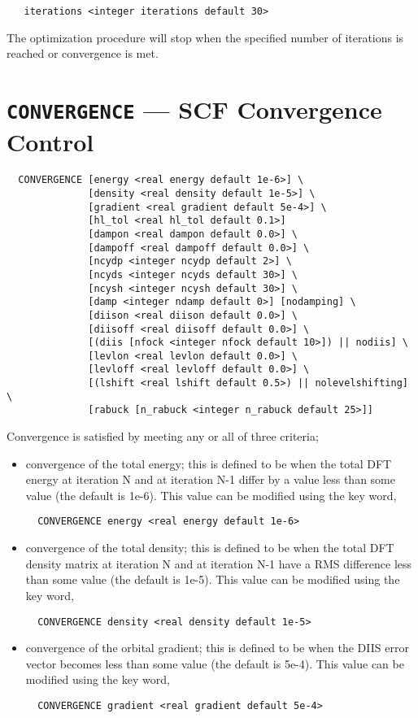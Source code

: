 \begin{verbatim}
   iterations <integer iterations default 30>
\end{verbatim}

The optimization procedure will stop when the specified number of
iterations is reached or convergence is met.

\section{{\tt CONVERGENCE} --- SCF Convergence Control}
\label{sec:dftconv}

\begin{verbatim}
  CONVERGENCE [energy <real energy default 1e-6>] \
              [density <real density default 1e-5>] \
              [gradient <real gradient default 5e-4>] \
              [hl_tol <real hl_tol default 0.1>]
              [dampon <real dampon default 0.0>] \
              [dampoff <real dampoff default 0.0>] \
              [ncydp <integer ncydp default 2>] \
              [ncyds <integer ncyds default 30>] \
              [ncysh <integer ncysh default 30>] \
              [damp <integer ndamp default 0>] [nodamping] \
              [diison <real diison default 0.0>] \
              [diisoff <real diisoff default 0.0>] \
              [(diis [nfock <integer nfock default 10>]) || nodiis] \
              [levlon <real levlon default 0.0>] \
              [levloff <real levloff default 0.0>] \
              [(lshift <real lshift default 0.5>) || nolevelshifting] \
              [rabuck [n_rabuck <integer n_rabuck default 25>]]
\end{verbatim}

Convergence is satisfied by meeting any or all of three criteria;
\begin{itemize}
\item convergence of the total energy; this is defined to be when the
  total DFT energy at iteration N and at iteration N-1 differ by a value less
  than some value (the default is 1e-6).  This value can be modified
  using the key word,
\begin{verbatim}
  CONVERGENCE energy <real energy default 1e-6>
\end{verbatim}

\item convergence of the total density; this is defined to be when the
  total DFT density matrix at iteration N and at iteration N-1 have a
  RMS difference less than some value (the default is 1e-5).  This value can be modified
  using the key word,
\begin{verbatim}
  CONVERGENCE density <real density default 1e-5>
\end{verbatim}

\item convergence of the orbital gradient; this is defined to be when the
  DIIS error vector becomes less than some value (the default is
  5e-4).  This value can be modified using the key word,
\begin{verbatim}
  CONVERGENCE gradient <real gradient default 5e-4>
\end{verbatim}
\end{itemize}

